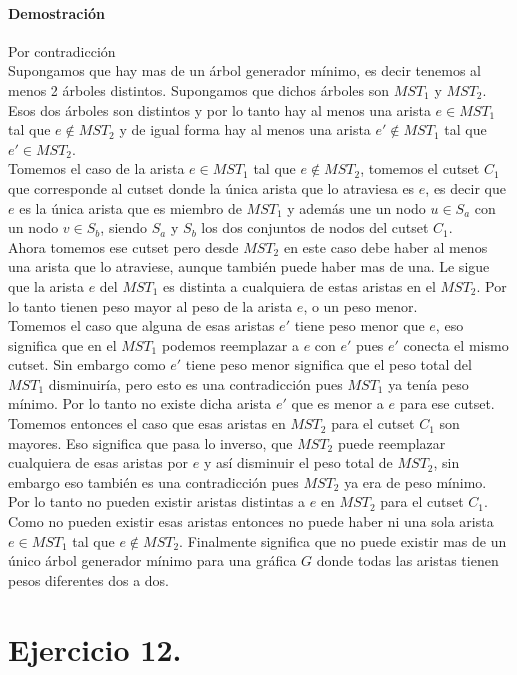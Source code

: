 \documentclass[12pt]{article}
\begin{document}
\paragraph{Demostración} Por contradicción\\
Supongamos que hay mas de un árbol generador mínimo, es decir tenemos al menos 2 árboles distintos. Supongamos que dichos árboles son $MST_1$ y $MST_2$. Esos dos árboles son distintos y por lo tanto hay al menos una arista $e \in MST_1$ tal que $e\notin MST_2$ y de igual forma hay al menos una arista $e' \notin MST_1$ tal que $e'\in MST_2$.\\
Tomemos el caso de la  arista $e \in MST_1$ tal que $e\notin MST_2$, tomemos el cutset $C_1$ que corresponde al cutset donde la única arista que lo atraviesa es $e$, es decir que $e$ es la única arista que es miembro de $MST_1$ y además une un nodo $u\in S_a$ con un nodo $v\in S_b$,  siendo $S_a$ y $S_b$ los dos conjuntos de nodos del cutset $C_1$.\\
Ahora tomemos ese cutset pero desde $MST_2$ en este caso debe haber al menos una arista que lo atraviese, aunque también puede haber mas de una. Le sigue que la arista $e$ del $MST_1$ es distinta a cualquiera de estas aristas en el $MST_2$. Por lo tanto tienen peso mayor al peso de la arista $e$, o un peso menor.\\ Tomemos el caso que alguna de esas aristas $e'$ tiene peso menor que $e$, eso significa que en el $MST_1$ podemos reemplazar a $e$ con $e'$ pues $e'$ conecta el mismo cutset. Sin embargo como $e'$ tiene peso menor significa que el peso total del $MST_1$ disminuiría, pero esto es una contradicción pues $MST_1$ ya tenía peso mínimo. Por lo tanto no existe dicha arista $e'$ que es menor a $e$ para ese cutset. Tomemos entonces el caso que esas aristas en $MST_2$ para el cutset $C_1$ son mayores. Eso significa que pasa lo inverso, que $MST_2$ puede reemplazar cualquiera de esas aristas por $e$ y así disminuir el peso total de $MST_2$, sin embargo eso también es una contradicción pues $MST_2$ ya era de peso mínimo. Por lo tanto no pueden existir aristas distintas a $e$ en $MST_2$  para el cutset $C_1$. Como no pueden existir esas aristas entonces no puede haber ni una sola arista $e\in MST_1$ tal que $e\notin MST_2$. Finalmente significa que no puede existir mas de un único árbol generador mínimo para una gráfica $G$ donde todas las aristas tienen pesos diferentes dos a dos.
\section{Ejercicio 12.}
\end{document}
